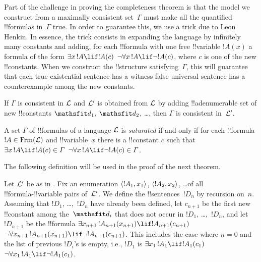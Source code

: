 \documentclass[../../include/open-logic-section]{subfiles}
\begin{document}


\begin{explain}
Part of the challenge in proving the completeness theorem is that the
model we construct from a maximally consistent set~$\Gamma$ must make
all the quantified !!{formula}s in~$\Gamma$ true.  In order to
guarantee this, we use a trick due to Leon Henkin.  In essence, the
trick consists in expanding the language by infinitely many constants
and adding, for each !!{formula} with one free !!{variable} $!A(x)$ a
formula of the form 
      {$\lexists[x][!A] \lif !A(c)$}
      {$\lnot\lforall[x][!A] \lif \lnot !A(c)$},
where $c$ is one of the new !!{constant}s.  When we construct the
!!{structure} satisfying~$\Gamma$, this will guarantee that each
{true existential sentence has a witness}
{false universal sentence has a counterexample}
among the new constants.
\end{explain}

\begin{lem}
If $\Gamma$ is consistent in $\mathcal L$ and $\mathcal L'$ is obtained from
$\mathcal L$ by adding !!a{denumerable} set of new !!{constant}s $\Obj d_1$,
$\Obj d_2$, \dots, then $\Gamma$ is consistent in~$\mathcal L'$.
\end{lem}

\begin{defn}
A set $\Gamma$ of !!{formula}s of a language $\mathcal L$ is
\emph{saturated} if and only if for each !!{formula} $!A \in \Frm[L]$
and !!{variable}~$x$ there is a !!{constant} $c$ such that
      {$\lexists[x][!A] \lif !A(c) \in \Gamma$}
      {$\lnot\lforall[x][!A] \lif \lnot !A(c) \in \Gamma$}.
\end{defn}

The following definition will be used in the proof of the next theorem.

\begin{defn}
Let $\mathcal L'$ be as in .  Fix an enumeration
$\langle !A_1, x_1 \rangle$, $\langle !A_2, x_2 \rangle$, \dots of all
!!{formula}-!!{variable} pairs of~$\mathcal L'$.  We define the
!!{sentence}s~$!D_n$ by recursion on~$n$. Assuming that $!D_1$,
\dots,~$!D_n$ have already been defined, let $c_{n+1}$ be the first
new !!{constant} among the~$\Obj d_i$ that does not occur in $!D_1$,
\dots,~$!D_n$, and let $!D_{n+1}$ be the !!{formula} 
     {$\lexists[x_{n+1}][!A_{n+1}(x_{n+1})] \lif !A_{n+1}(c_{n+1})$}
     {$\lnot\lforall[x_{n+1}][!A_{n+1}(x_{n+1})] \lif \lnot
       !A_{n+1}(c_{n+1})$}.  This includes the case where $n = 0$ and
     the list of previous $!D_i$'s is empty, i.e., $!D_1$ is
      {$\lexists[x_1][!A_1] \lif !A_1(c_1)$}
           {$\lnot\lforall[x_1][!A_1] \lif \lnot !A_1(c_1)$}.
\end{defn}
\end{document}
